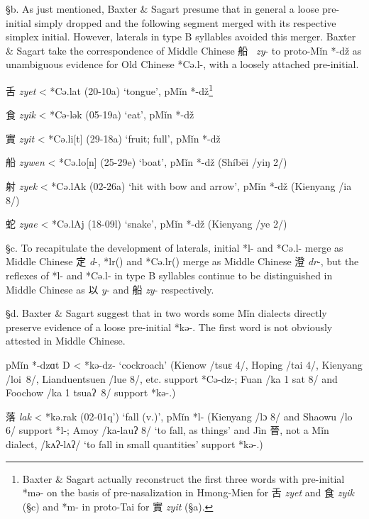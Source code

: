 §b. As just mentioned, Baxter \& Sagart presume that in general a loose
pre-initial simply dropped and the following segment merged with its
respective simplex initial. However, laterals in type B syllables
avoided this merger. Baxter \& Sagart take the correspondence of Middle
Chinese 船~ \emph{zy}- to proto-Mǐn *-dž as unambiguous evidence for Old
Chinese *Cə.l-, with a loosely attached pre-initial.

\begin{description} \item
舌 \emph{zyet} \textless{} *Cə.lat (20-10a) `tongue', pMǐn
*-dž\footnote{Baxter \& Sagart actually reconstruct the first three
  words with pre-initial *mə- on the basis of pre-nasalization in
  Hmong-Mien for 舌 \emph{zyet} and 食  \emph{zyik} (§c) and *m- in
  proto-Tai for 實 \emph{zyit} (§a). }

\item
食 \emph{zyik} \textless{} *Cə-lək (05-19a) `eat', pMǐn *-dž

\item
實 \emph{zyit} \textless{} *Cə.li{[}t] (29-18a) `fruit; full', pMǐn
*-dž

\item
船 \emph{zywen} \textless{} *Cə.lo[n] (25-29e) `boat', pMǐn *-dž
(Shíbēi /yiŋ 2/)

\item
射 \emph{zyek} \textless{} *Cə.lAk (02-26a) `hit with bow and arrow',
pMǐn *-dž (Kienyang /ia 8/)

\item
蛇 \emph{zyae} \textless{} *Cə.lAj (18-09l) `snake', pMǐn *-dž (Kienyang
/ye 2/)
\end{description}

§c. To recapitulate the development of laterals, initial *l{}- and
*Cə.l{}- merge as Middle Chinese 定 \emph{d}-, *lr({}) and *Cə.lr({}) merge
as Middle Chinese 澄 \emph{dr}-, but the reflexes of *l- and *Cə.l- in
type B syllables continue to be distinguished in Middle Chinese as 以
\emph{y}- and 船 \emph{zy}- respectively.

§d. Baxter \& Sagart suggest that in two words some Mǐn dialects
directly preserve evidence of a loose pre-initial *kə-. The first word
is not obviously attested in Middle Chinese.

\begin{description} \item
pMǐn *-dzɑt D \textless{} *kə-dz{}- `cockroach' (Kienow /tsuɛ 4/, Hoping
/t{}ai 4/, Kienyang /loi~8/, Lianduentsuen /lue 8/, etc. support
*Cə-dz{}-; Fuan /ka 1 sat 8/ and Foochow /ka 1 tsuaʔ~8/ support *kə-.)

\item
落 \emph{lak} \textless{} *kə.r{}ak (02-01q') `fall (v.)', pMǐn *l-
(Kienyang /lɔ 8/ and Shaowu /lo 6/ support *l-; Amoy /ka-lauʔ 8/ `to
fall, as things' and Jìn 晉, not a Mǐn dialect, /kʌʔ‑lʌʔ/ `to fall in
small quantities' support *kə-.)
\end{description}

